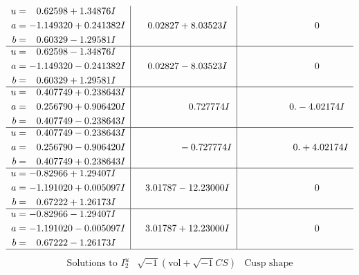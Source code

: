 \documentclass[1p]{elsarticle_modified}
\theoremstyle{definition}
\newcommand{\I}{\sqrt{-1}}
\begin{document}
$$\begin{array}{c|c|c}
\begin{aligned}
u &= \phantom{-}0.62598 + 1.34876 I \\
a &= -1.149320 + 0.241382 I \\
b &= \phantom{-}0.60329 - 1.29581 I\end{aligned}
 & \phantom{-}0.02827 + 8.03523 I & \phantom{-0.000000 } 0 \\ \hline\begin{aligned}
u &= \phantom{-}0.62598 - 1.34876 I \\
a &= -1.149320 - 0.241382 I \\
b &= \phantom{-}0.60329 + 1.29581 I\end{aligned}
 & \phantom{-}0.02827 - 8.03523 I & \phantom{-0.000000 } 0 \\ \hline\begin{aligned}
u &= \phantom{-}0.407749 + 0.238643 I \\
a &= \phantom{-}0.256790 + 0.906420 I \\
b &= \phantom{-}0.407749 - 0.238643 I\end{aligned}
 & \phantom{-0.000000 -}0.727774 I & \phantom{-0.000000 } 0. - 4.02174 I \\ \hline\begin{aligned}
u &= \phantom{-}0.407749 - 0.238643 I \\
a &= \phantom{-}0.256790 - 0.906420 I \\
b &= \phantom{-}0.407749 + 0.238643 I\end{aligned}
 & \phantom{-0.000000 } -0.727774 I & \phantom{-0.000000 -}0. + 4.02174 I \\ \hline\begin{aligned}
u &= -0.82966 + 1.29407 I \\
a &= -1.191020 + 0.005097 I \\
b &= \phantom{-}0.67222 + 1.26173 I\end{aligned}
 & \phantom{-}3.01787 - 12.23000 I & \phantom{-0.000000 } 0 \\ \hline\begin{aligned}
u &= -0.82966 - 1.29407 I \\
a &= -1.191020 - 0.005097 I \\
b &= \phantom{-}0.67222 - 1.26173 I\end{aligned}
 & \phantom{-}3.01787 + 12.23000 I & \phantom{-0.000000 } 0\\
 \hline 
 \end{array}$$\newpage$$\begin{array}{c|c|c}  
\text{Solutions to }I^u_{2}& \I (\text{vol} + \sqrt{-1}CS) & \text{Cusp shape}\\

\end{array}$$
\end{document}
